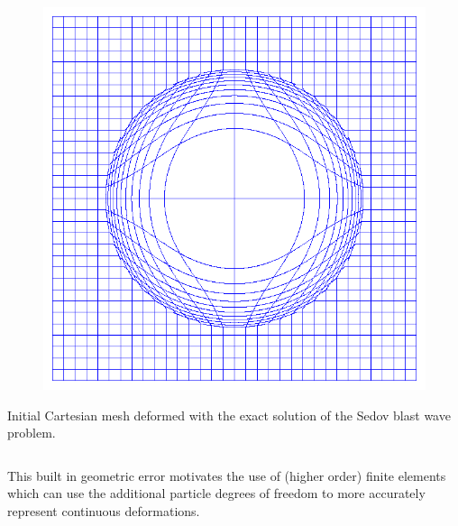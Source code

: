 \documentclass[8pt,xcolor=svgnames]{beamer}
\begin{document}
\begin{frame}
\begin{columns}[T]
\begin{column}{0.3\textwidth}
\begin{block}{}
\begin{figure}[h!]
    \includegraphics[width=1.0\textwidth,keepaspectratio=true]{./Images/sedovCart.png}
    \end{figure}
    Initial Cartesian mesh deformed with the exact solution of the Sedov blast wave problem. 
   \end{block}
  \end{column}
 \end{columns}
 \begin{block}{}
  This built in geometric error motivates the use of (higher order) finite elements which can use the additional particle degrees of freedom to more accurately represent continuous deformations.
 \end{block}
\end{frame}

\end{document}
